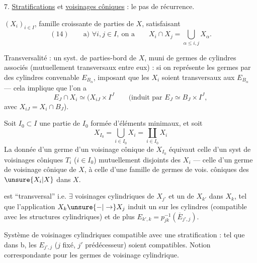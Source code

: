 7. \uline{Stratifications} et \uline{voisinages côniques} : le pas
de récurrence.

$(X_i)_{i\in I}$, famille croissante de parties de $X$,
satisfaisant
\[
(14)\qquad\text{a) }\forall i,j\in I,\ \text{on a}\qquad
X_i\cap X_j=\bigcup_{\alpha\le i,j}X_\alpha.
\]


Transversalité : un syst. de parties-bord  de
$X$, muni de germes de cylindres associés
(mutuellement transversaux entre eux) : si on
représente les germes par des cylindres convenable
$E_{B_\alpha}$, imposant que les $X_i$ soient transversaux
aux $E_{B_\alpha}$ --- cela implique que l'on a
\[
E_J\cap X_i\simeq (X_{iJ}\times I^J
\qquad
\text{(induit par }E_J\simeq B_J\times I^J,
\]
avec $X_{iJ}=X_i\cap B_J$).

Soit $I_0\subset I$ une partie de $I_0$ formée
d'éléments minimaux,  et soit
\[
X_{I_0}=\bigcup_{i\in I_0}X_i=\coprod_{i\in I_0}X_i
\]
La donnée d'un germe 
d'un voisinage cônique  de $X_{I_0}$ équivaut 
celle d'un syst de voisinages côniques
$T_i$ ($i\in I_0$) mutuellement disjoints des $X_i$ ---
celle d'un germe de voisinage cônique de $X$,
à celle d'une famille de germes de vois.
côniques des $\unsure{X_i|X}$ dans $X$.

est ``transversal'' i.e.  $\exists$ voisinages cylindriques
de $X_{j'}$  et un de $X_{k'}$ dans $X_k$, tel que l'application
$X_k\unsure{-|\to}X_j$ induit un  sur les
cylindres (compatible avec les structures
cylindriques) et de plus
$E_{k',k}=p_{jk}^{-1}(\overline E_{j',j})$.

Système de voisinages cylindriques 
compatible avec une stratification : tel que
dans b, les $E_{j',j}$ ($j$ fixé, $j'$ prédécesseur)
soient compatibles. Notion correspondante
pour les germes de voisinage cylindrique.

